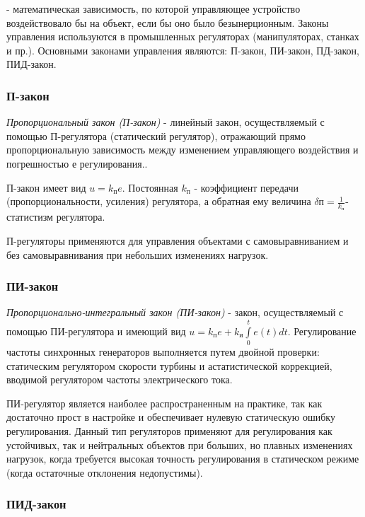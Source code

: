\documentclass[../../TAU.tex]{subfiles}
\begin{document}
     - математическая зависимость, по которой управляющее устройство воздействовало бы на объект, если бы оно было безынерционным. Законы управления используются в промышленных регуляторах (манипуляторах, станках и пр.). Основными законами управления являются: П-закон, ПИ-закон, ПД-закон, ПИД-закон.

\subsubsection{П-закон}

    {\it Пропорциональный закон (П-закон)} - линейный закон, осуществляемый с помощью П-регулятора (статический регулятор), отражающий прямо пропорциональную зависимость между изменением управляющего воздействия и погрешностью $е$ регулирования.. \par
    П-закон имеет вид $u = k_{\text{п}} e$.  Постоянная $k_{\text{п}}$ - коэффициент передачи (пропорциональности, усиления) регулятора, а обратная ему величина $\delta\text{п}=\frac{1}{k_{\text{п}}}$- статистизм регулятора.  \par
    П-регуляторы применяются для управления объектами с самовыравниванием и без самовыравнивания при небольших изменениях нагрузок. 


\subsubsection{ПИ-закон}

    {\it Пропорционально-интегральный закон (ПИ-закон)} - закон, осуществляемый с помощью ПИ-регулятора и имеющий вид $u=k_\text{п}e+ k_\text{и}\int\limits_0^t e(t) dt$.  Регулирование частоты синхронных генераторов выполняется путем двойной проверки: статическим регулятором скорости турбины и астатистической коррекцией, вводимой регулятором частоты электрического тока. \par
    ПИ-регулятор является наиболее распространенным на практике, так как достаточно прост в настройке и обеспечивает нулевую статическую ошибку регулирования. Данный тип регуляторов применяют для регулирования как устойчивых, так и нейтральных объектов при больших, но плавных изменениях нагрузок, когда требуется высокая точность регулирования в статическом режиме (когда остаточные отклонения недопустимы).


\subsubsection{ПИД-закон}
\end{document}
